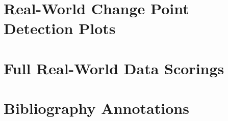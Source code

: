 \documentclass{uvamscse}	%
\begin{document}
\chapter{Real-World Change Point Detection Plots}
\label{changeplots}




\chapter{Full Real-World Data Scorings}
\label{fullscores}




\chapter{Bibliography Annotations}

\end{document}
